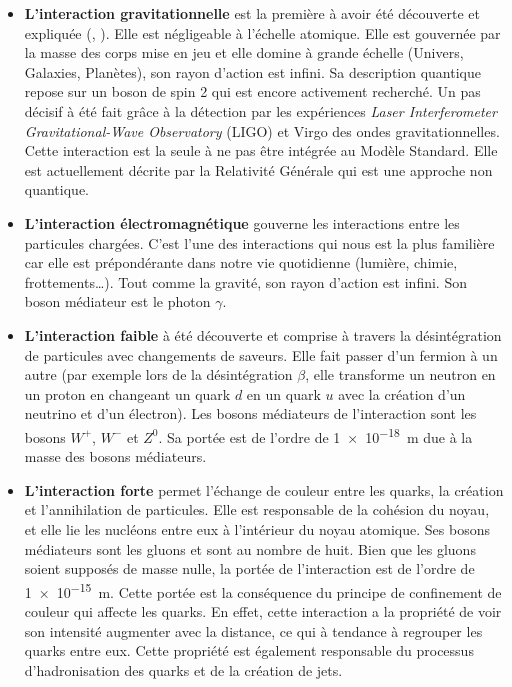 \begin{itemize}[label=$\bullet$]
\item \textbf{L'interaction gravitationnelle} est la première à avoir été découverte et expliquée (, ). Elle est négligeable à l'échelle atomique. Elle est gouvernée par la masse des corps mise en jeu et elle domine à grande échelle (Univers, Galaxies, Planètes), son rayon d'action est infini. Sa description quantique repose sur un boson de spin \num{2} qui est encore activement recherché. Un pas décisif à été fait grâce à la détection par les expériences \textit{Laser Interferometer Gravitational-Wave Observatory} (LIGO) et Virgo des ondes gravitationnelles. Cette interaction est la seule à ne pas être intégrée au Modèle Standard. Elle est actuellement décrite par la Relativité Générale qui est une approche non quantique.

\item \textbf{L'interaction électromagnétique} gouverne les interactions entre les particules chargées. C'est l'une des interactions qui nous est la plus familière car elle est prépondérante dans notre vie quotidienne (lumière, chimie, frottements\ldots). Tout comme la gravité, son rayon d'action est infini. Son boson médiateur est le photon $\gamma$.

\item \textbf{L'interaction faible} à été découverte et comprise à travers la désintégration de particules avec changements de saveurs. Elle fait passer d'un fermion à un autre (par exemple lors de la désintégration $\beta$, elle transforme un neutron en un proton en changeant un quark $d$ en un quark $u$ avec la création d'un neutrino et d'un électron). Les bosons médiateurs de l'interaction sont les bosons $W^{+}$, $W^{-}$ et $Z^{0}$. Sa portée est de l'ordre de \SI{1e-18}{\meter} due à la masse des bosons médiateurs.

\item \textbf{L'interaction forte} permet l'échange de couleur entre les quarks, la création et l'annihilation de particules. Elle est responsable de la cohésion du noyau, et elle lie les nucléons entre eux à l'intérieur du noyau atomique. Ses bosons médiateurs sont les gluons et sont au nombre de huit. Bien que les gluons soient supposés de masse nulle, la portée de l'interaction est de l'ordre de \SI{1e-15}{\meter}. Cette portée est la conséquence du principe de confinement de couleur qui affecte les quarks. En effet, cette interaction a la propriété de voir son intensité augmenter avec la distance, ce qui à tendance à regrouper les quarks entre eux. Cette propriété est également responsable du processus d'hadronisation des quarks et de la création de jets.
\end{itemize}

